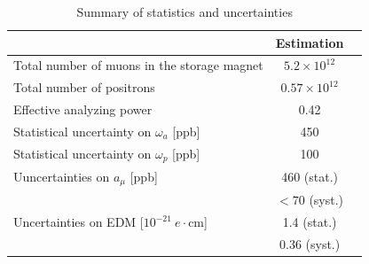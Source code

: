\begin{table}[t]
  \caption{Summary of statistics and uncertainties}
  \label{tab:sensitivity}
  \begin{center}
  \begin{tabular}{|p{}|c|c}
  \hline
          & Estimation \\
    \hline
    \hline
    Total number of muons in the storage magnet & $5.2 \times 10^{12}$ \\
    Total number of positrons &  $0.57\times 10^{12}$ \\
    Effective analyzing power &  0.42 \\
    \hline
    Statistical uncertainty on $\omega_{a}$ [ppb]  &  450 \\
    Statistical uncertainty on $\omega_{p}$ [ppb]  &  100 \\
    \hline
    Uuncertainties on $a_{\mu}$ [ppb]  & 460 (stat.) \\ 
                                                            & $<70$ (syst.) \\
    \hline
    Uncertainties on EDM [$10^{-21}~e\cdot$cm]  & 1.4 (stat.) \\
                                                                              & 0.36 (syst.) \\
    \hline
  \end{tabular}
  \end{center}
\end{table}

